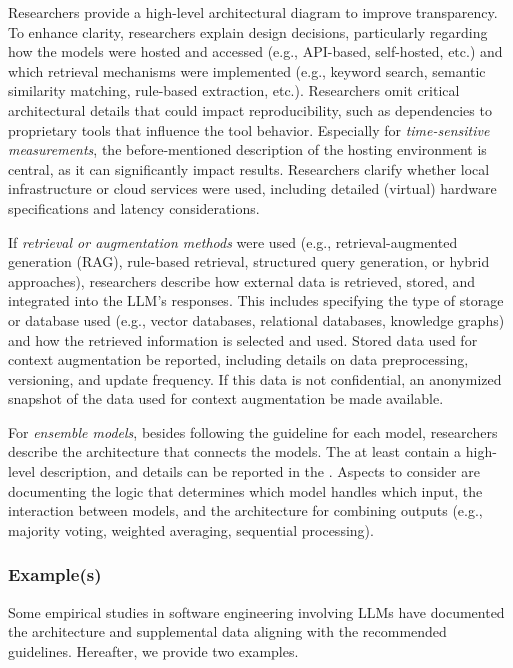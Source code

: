 Researchers \should provide a high-level architectural diagram to improve transparency.
To enhance clarity, researchers \should explain design decisions, particularly regarding how the models were hosted and accessed (e.g., API-based, self-hosted, etc.) and which retrieval mechanisms were implemented (e.g., keyword search, semantic similarity matching, rule-based extraction, etc.).
Researchers \mustnot omit critical architectural details that could impact reproducibility, such as dependencies to proprietary tools that influence the tool behavior. 
Especially for \emph{time-sensitive measurements}, the before-mentioned description of the hosting environment is central, as it can significantly impact results.
Researchers \must clarify whether local infrastructure or cloud services were used, including detailed (virtual) hardware specifications and latency considerations.

If \emph{retrieval or augmentation methods} were used (e.g., retrieval-augmented generation (RAG), rule-based retrieval, structured query generation, or hybrid approaches), researchers \must describe how external data is retrieved, stored, and integrated into the LLM's responses.
This includes specifying the type of storage or database used (e.g., vector databases, relational databases, knowledge graphs) and how the retrieved information is selected and used.
Stored data used for context augmentation \must be reported, including details on data preprocessing, versioning, and update frequency.
If this data is not confidential, an anonymized snapshot of the data used for context augmentation \should be made available.

For \emph{ensemble models}, besides following the \modelversion guideline for each model, researchers \must describe the architecture that connects the models.
The \paper \must at least contain a high-level description, and details can be reported in the \supplementarymaterial.
Aspects to consider are documenting the logic that determines which model handles which input, the interaction between models, and the architecture for combining outputs (e.g., majority voting, weighted averaging, sequential processing).


\subsubsection{Example(s)}

Some empirical studies in software engineering involving LLMs have documented the architecture and supplemental data aligning with the recommended guidelines. Hereafter, we provide two examples.

